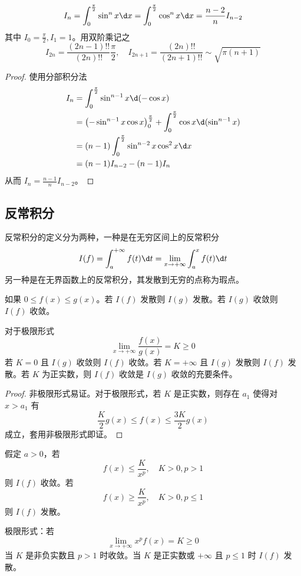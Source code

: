 \begin{theorem}[Wallis 公式]
	\[ I_n = \int_{0}^{\frac{\pi}{2}} \sin^n x \d x = \int_{0}^{\frac{\pi}{2}} \cos^n x \d x = \frac{n-2}{n}I_{n-2} \]
	其中 $I_0 = \frac{\pi}{2}, I_1 = 1$。用双阶乘记之
	\[ I_{2n}=\frac{(2n-1)!!}{(2n)!!}\frac{\pi}{2}, \quad I_{2n+1}=\frac{(2n)!!}{(2n+1)!!} \sim \sqrt{\pi (n+1)} \]
\end{theorem}

\begin{proof}
	使用分部积分法
	\[ \begin{aligned}
			I_n & = \int_{0}^{\frac{\pi}{2}} \sin^{n-1} x \d (-\cos x)                                                      \\
			    & = \left(-\sin^{n-1} x \cos x\right)_0^{\frac{\pi}{2}} + \int_{0}^{\frac{\pi}{2}} \cos x \d (\sin^{n-1} x) \\
			    & = (n-1) \int_{0}^{\frac{\pi}{2}} \sin^{n-2} x \cos^2 x \d x                                               \\
			    & = (n-1) I_{n-2} - (n-1)I_n
		\end{aligned} \]
	从而 $I_n = \frac{n-1}{n} I_{n-2}$。
\end{proof}

\subsection{反常积分}

反常积分的定义分为两种，一种是在无穷区间上的反常积分
\[ I(f) = \int_{a}^{+\infty} f(t) \d t = \lim_{x \to +\infty} \int_{a}^{x} f(t) \d t \]
另一种是在无界函数上的反常积分，其发散到无穷的点称为瑕点。

\begin{theorem}[比较判别法]
	如果 $0 \leqslant f(x) \leqslant g(x)$。若 $I(f)$ 发散则 $I(g)$ 发散。若 $I(g)$ 收敛则 $I(f)$ 收敛。

	对于极限形式
	\[ \lim_{x \to +\infty} \frac{f(x)}{g(x)} = K \geqslant 0 \]
	若 $K = 0$ 且 $I(g)$ 收敛则 $I(f)$ 收敛。若 $K = +\infty$ 且 $I(g)$ 发散则 $I(f)$ 发散。若 $K$ 为正实数，则 $I(f)$ 收敛是 $I(g)$ 收敛的充要条件。
\end{theorem}

\begin{proof}
	非极限形式易证。对于极限形式，若 $K$ 是正实数，则存在 $a_1$ 使得对 $x > a_1$ 有
	\[ \frac{K}{2} g(x) \leqslant f(x) \leqslant \frac{3K}{2} g(x) \]
	成立，套用非极限形式即证。
\end{proof}

\begin{theorem}
	假定 $a > 0$，若
	\[ f(x) \leqslant \frac{K}{x^p}, \quad K > 0, p > 1 \]
	则 $I(f)$ 收敛。若
	\[ f(x) \geqslant \frac{K}{x^p}, \quad K > 0, p \leqslant 1 \]
	则 $I(f)$ 发散。

	极限形式：若
	\[ \lim_{x \to +\infty} x^p f(x) = K \geqslant 0 \]
	当 $K$ 是非负实数且 $p > 1$ 时收敛。当 $K$ 是正实数或 $+\infty$ 且 $p \leqslant 1$ 时 $I(f)$ 发散。
\end{theorem}

